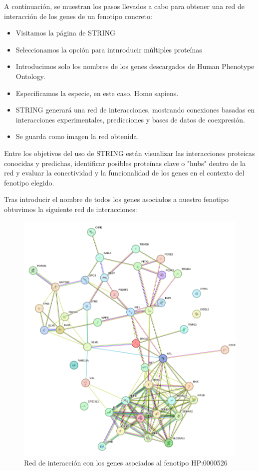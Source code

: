 A continuación, se muestran los pasos llevados a cabo para obtener una red de interacción de los genes de un fenotipo concreto:

\begin{itemize}
	\item Visitamos la página de STRING
	\item Seleccionamos la opción para intnroducir múltiples proteínas
	\item Introducimos solo los nombres de los genes descargados de Human Phenotype Ontology.
	\item Especificamos la especie, en este caso, Homo sapiens.
	\item STRING generará una red de interacciones, mostrando conexiones basadas en interacciones experimentales, predicciones y bases de datos de coexpresión.
	\item Se guarda como imagen la red obtenida.
\end{itemize}

Entre los objetivos del uso de STRING están visualizar las interacciones proteicas conocidas y predichas, identificar posibles proteínas clave o "hubs" dentro de la red y evaluar la conectividad y la funcionalidad de los genes en el contexto del fenotipo elegido.

Tras introducir el nombre de todos los genes asociados a nuestro fenotipo obtuvimos la siguiente red de interacciones:

\newpage

\begin{figure}[h] %
	\centering
	\includegraphics[width=1\textwidth]{figures/red_interaccion_aniridia.png} %
	\caption{Red de interacción con los genes asociados al fenotipo HP:0000526} %
	\label{fig:mi-imagen} %
\end{figure}

